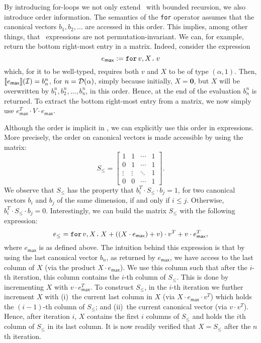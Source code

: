By introducing for-loops we not only extend \lang\ with bounded recursion, we also introduce order information. 
The semantics of the \texttt{for} operator assumes that the canonical vectors $b_1,b_2,\ldots$
are accessed in this order. This implies, among other things, that \langfor\ expressions are not permutation-invariant.
We can, for example, return the bottom right-most entry in a matrix. Indeed, consider the expression 
$$
e_{\mathsf{max}} := \texttt{for}\, v,X \texttt{.}\, v
$$
which, for it to be well-typed, requires both $v$ and $X$ to be of type $(\alpha,1)$. Then, $\llbracket e_{\mathsf{max}} \rrbracket(\mathcal{I})=b_n^n$, for $n=\mathcal{D}(\alpha)$, simply because initially, $X=\mathbf{0}$, but $X$ will be overwritten by $b_1^n,b_2^n,\ldots,b_n^n$, in this order. Hence, at the end of the evaluation $b_n^n$ is returned.
To extract the bottom right-most entry from a matrix, we now simply use $e_{\mathsf{max}}^T\cdot V\cdot e_{\mathsf{max}}$.

Although the order is implicit in \langfor, we can explicitly use this order in \langfor expressions. More precisely, the order on canonical vectors is made accessible by
using the matrix:
\[
S_{\leq} = \begin{bmatrix}
1 & 1 & \cdots &  1 \\
0 & 1 & \cdots & 1\\
\vdots & \vdots & \ddots & 1 \\
0 & 0 & \cdots & 1 
\end{bmatrix}.
\] 
We observe that $S_{\leq}$ has the property that $b_i^T\cdot S_{\leq} \cdot b_j=1$, for two canonical vectors $b_i$ and $b_j$ of the same dimension, if and only if $i\leq j$. Otherwise, $b_i^T\cdot S_{\leq} \cdot b_j=0$. 
Interestingly, we can build the matrix $S_{\leq}$ with the following \langfor expression:
$$
e_{\leq}=\texttt{for}\, v,X \texttt{.}\, X + \left((X\cdot e_{\mathsf{max}}) + v \right)\cdot v^T + v\cdot e^T_{\mathsf{max}},
$$
where $e_{\mathsf{max}}$ is as defined above. The intuition behind this expression is that by using the last canonical vector $b_n$, as returned by $e_{\mathsf{max}}$, we have access to the last column of $X$ (via the product $X\cdot e_{\mathsf{max}}$). We use this column such that after the $i$-th iteration, this column contains the $i$-th column of $S_{\leq}$. This is done by incrementing $X$ with $v\cdot e_{\mathsf{max}}^T$.
To construct $S_{\leq}$, in the $i$-th iteration we further increment $X$ with 
(i)~the current last column in $X$ (via $X\cdot e_{\mathsf{max}}\cdot v^T$) which holds
the $(i-1)$-th column of $S_{\leq}$; and (ii)~the current canonical vector (via $v\cdot v^T$). Hence, after iteration $i$, $X$ contains the first $i$ columns of $S_{\leq}$ and holds the $i$th column of $S_{\leq}$ in its last column. It is now readily verified that $X=S_{\leq}$ after the $n$th iteration.

